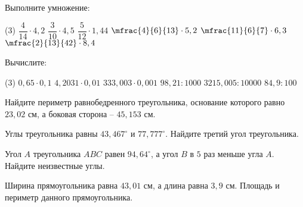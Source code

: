 \begin{homework}[number=2]
	\begin{listofex}
		\item Выполните умножение:
		\begin{tasks}(3)
			\task \( \dfrac{4}{14}\cdot4,2 \)
			\task\( \dfrac{3}{10}\cdot4,5 \)
			\task\( \dfrac{5}{12}\cdot1,44 \)
			\task \( \mfrac{4}{6}{13}\cdot5,2 \)
			\task \( \mfrac{11}{6}{7}\cdot6,3 \)
			\task \( \mfrac{2}{13}{42}\cdot 8,4 \)
		\end{tasks}
		\item Вычислите: \begin{tasks}(3)
			\task \( 0,65\cdot0,1 \)
			\task \( 4,2031\cdot0,01 \)
			\task \( 333,003\cdot0,001 \)
			\task \( 98,21:1000 \)
			\task \( 3215,005:10000 \)
			\task \( 84,9:100 \)
		\end{tasks}
		\item Найдите периметр равнобедренного треугольника, основание которого равно \( 23,02 \) см, а боковая сторона – \( 45,153 \) см.
		\item Углы треугольника равны \( 43,467^{\circ} \) и \( 77,777^{\circ} \). Найдите третий угол треугольника.
		\item Угол \( A \) треугольника \( ABC \) равен \( 94,64^{\circ} \), а угол \( B \) в \( 5 \) раз меньше угла \( A \). Найдите неизвестные углы.
		\item Ширина прямоугольника равна \( 43,01 \) см, а длина равна \( 3,9 \) см. Площадь и периметр данного прямоугольника.
	\end{listofex}
\end{homework}

